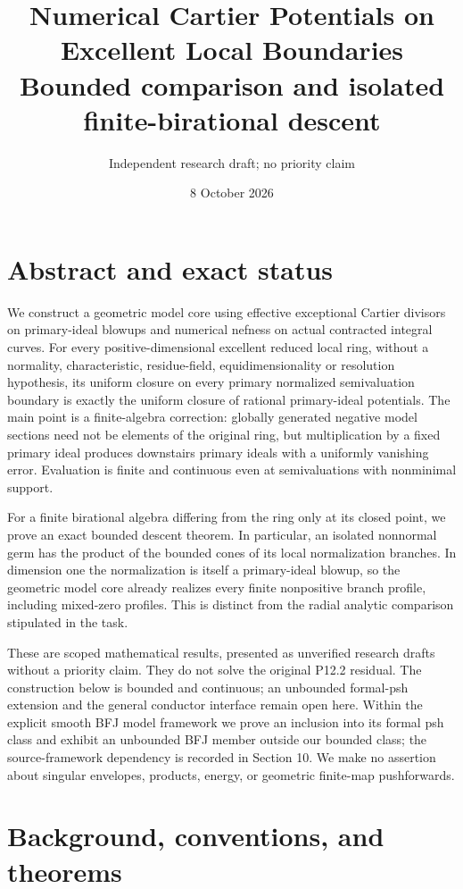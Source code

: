 \documentclass[11pt]{article}
\title{Numerical Cartier Potentials on Excellent Local Boundaries\\
\large Bounded comparison and isolated finite-birational descent}
\author{Independent research draft; no priority claim}
\date{8 October 2026}
\begin{document}
\maketitle

\section*{Abstract and exact status}

We construct a geometric model core using effective exceptional Cartier divisors on primary-ideal blowups and numerical nefness on actual contracted integral curves. For every positive-dimensional excellent reduced local ring, without a normality, characteristic, residue-field, equidimensionality or resolution hypothesis, its uniform closure on every primary normalized semivaluation boundary is exactly the uniform closure of rational primary-ideal potentials. The main point is a finite-algebra correction: globally generated negative model sections need not be elements of the original ring, but multiplication by a fixed primary ideal produces downstairs primary ideals with a uniformly vanishing error. Evaluation is finite and continuous even at semivaluations with nonminimal support.

For a finite birational algebra differing from the ring only at its closed point, we prove an exact bounded descent theorem. In particular, an isolated nonnormal germ has the product of the bounded cones of its local normalization branches. In dimension one the normalization is itself a primary-ideal blowup, so the geometric model core already realizes every finite nonpositive branch profile, including mixed-zero profiles. This is distinct from the radial analytic comparison stipulated in the task.

These are scoped mathematical results, presented as unverified research drafts without a priority claim. They do not solve the original P12.2 residual. The construction below is bounded and continuous; an unbounded formal-psh extension and the general conductor interface remain open here. Within the explicit smooth BFJ model framework we prove an inclusion into its formal psh class and exhibit an unbounded BFJ member outside our bounded class; the source-framework dependency is recorded in Section 10. We make no assertion about singular envelopes, products, energy, or geometric finite-map pushforwards.

\section{Background, conventions, and theorems}
\end{document}
